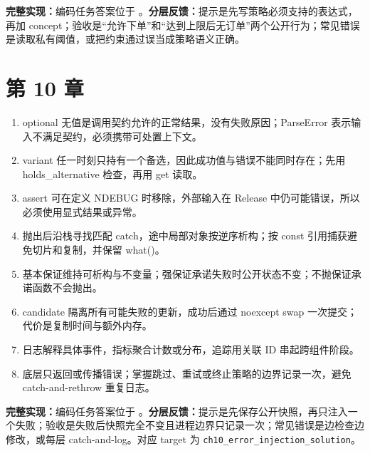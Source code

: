 \noindent\textbf{完整实现：}编码任务答案位于 。\textbf{分层反馈：}提示是先写策略必须支持的表达式，再加 concept；验收是“允许下单”和“达到上限后无订单”两个公开行为；常见错误是读取私有阈值，或把约束通过误当成策略语义正确。

\section{第 10 章}
\begin{enumerate}
  \item optional 无值是调用契约允许的正常结果，没有失败原因；ParseError 表示输入不满足契约，必须携带可处置上下文。
  \item variant 任一时刻只持有一个备选，因此成功值与错误不能同时存在；先用 holds\_alternative 检查，再用 get 读取。
  \item assert 可在定义 NDEBUG 时移除，外部输入在 Release 中仍可能错误，所以必须使用显式结果或异常。
  \item 抛出后沿栈寻找匹配 catch，途中局部对象按逆序析构；按 const 引用捕获避免切片和复制，并保留 what()。
  \item 基本保证维持可析构与不变量；强保证承诺失败时公开状态不变；不抛保证承诺函数不会抛出。
  \item candidate 隔离所有可能失败的更新，成功后通过 noexcept swap 一次提交；代价是复制时间与额外内存。
  \item 日志解释具体事件，指标聚合计数或分布，追踪用关联 ID 串起跨组件阶段。
  \item 底层只返回或传播错误；掌握跳过、重试或终止策略的边界记录一次，避免 catch-and-rethrow 重复日志。
\end{enumerate}

\noindent\textbf{完整实现：}编码任务答案位于 。\textbf{分层反馈：}提示是先保存公开快照，再只注入一个失败；验收是失败后快照完全不变且进程边界只记录一次；常见错误是边检查边修改，或每层 catch-and-log。对应 target 为 \texttt{ch10\_error\_injection\_solution}。

